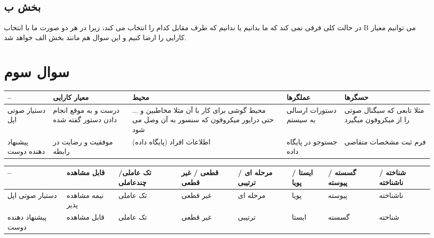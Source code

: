 \documentclass[paper=a4, fontsize=11pt]{article}
\begin{document}
\subsection{بخش ب}
در حالت کلی فرقی نمی کند که ما بدانیم یا ندانیم که طرف مقابل کدام را انتخاب می کند، زیرا در هر دو صورت ما با انتخاب B می توانیم معیار کارایی را ارضا کنیم و این سوال هم مانند بخش الف خواهد شد.


\section{سوال سوم}


\small
\begin{center}
 \begin{tabular}{|| m{} | m{} | m{} | m{} | m{} ||} 
 \hline
  --   & معیار کارایی & محیط & عملگرها & حسگرها \\ [0.5ex] 
 \hline\hline
دستیار صوتی اپل & درست و به موقع انجام دادن دستور گفته شده & محیط گوشی برای کار با آن مثلا مخاطبین و ... حتی درایور میکروفون که سنسور به آن وصل می شود & دستورات ارسالی به سیستم & مثلا تابعی که سیگنال صوتی را از میکروفون میگیرد \\
 \hline
پیشنهاد دهنده دوست & موفقیت و رضایت در رابطه & (پایگاه داده) اطلاعات افراد & جستوجو در پایگاه داده & فرم ثبت مشخصات متقاضی \\
 \hline
\end{tabular}
\end{center}
\normalsize

\small
\begin{center}
 \begin{tabular}{|| m{} | m{} |m{} |m{} |m{} |m{} |m{} |m{} ||} 
 \hline
  --   & قابل مشاهده & تک عاملی/ چندعاملی & قطعی / غیر قطعی & مرحله ای / ترتیبی & ایستا / پویا & گسسته / پیوسته & شناخته / ناشناخته \\ [0.5ex] 
 \hline\hline
دستیار صوتی اپل & نیمه مشاهده پذیر & تک عاملی & غیر قطعی & مرحله ای & پویا & پیوسته & ناشناخته \\
 \hline
پیشنهاد دهنده دوست & قابل مشاهده & تک عاملی & غیر قطعی & ترتیبی & ایستا & گسسته & شناخته \\
 \hline
\end{tabular}
\end{center}
\normalsize
\end{document}
